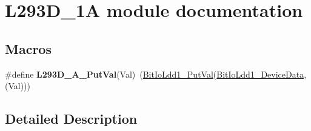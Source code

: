 \hypertarget{group___l293_d__1_a__module}{}\section{L293\+D\+\_\+1A module documentation}
\label{group___l293_d__1_a__module}
\subsection*{Macros}
\begin{DoxyCompactItemize}
\item 
\mbox{\label{group___l293_d__1_a__module_ga21e3d03d8a67653b36d7fc7b566acec4}} 
\#define {\bfseries L293\+D\+\_\+A\+\_\+\+Put\+Val}(Val)~(\hyperlink{group___bit_io_ldd1__module_ga753b1b610d7f46784d5e5ec7ca43d6cd}{Bit\+Io\+Ldd1\+\_\+\+Put\+Val}(\hyperlink{group___bit_io_ldd1__module_ga87620b3d6d232d352b6cd29d865efc18}{Bit\+Io\+Ldd1\+\_\+\+Device\+Data}, (Val)))
\end{DoxyCompactItemize}


\subsection{Detailed Description}
